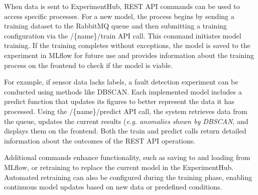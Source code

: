 \documentclass[preprint,12pt, a4paper]{elsarticle}
\begin{document}
When data is sent to ExperimentHub, REST API commands can be used to access specific processes. For a new model, the process begins by sending a training dataset to the RabbitMQ queue and then submitting a training configuration via the /\{name\}/train API call. This command initiates model training. If the training completes without exceptions, the model is saved to the experiment in MLflow for future use and provides information about the training process on the frontend to check if the model is viable.

For example, if sensor data lacks labels, a fault detection experiment can be conducted using methods like DBSCAN. Each implemented model includes a predict function that updates its figures to better represent the data it has processed. Using the /\{name\}/predict API call, the system retrieves data from the queue, updates the current results (\textit{e.g. anomalies shown by DBSCAN}, and displays them on the frontend. Both the train and predict calls return detailed information about the outcomes of the REST API operations.


Additional commands enhance functionality, such as saving to and loading from MLflow, or retraining to replace the current model in the ExperimentHub. Automated retraining can also be configured during the training phase, enabling continuous model updates based on new data or predefined conditions.



\end{document}
